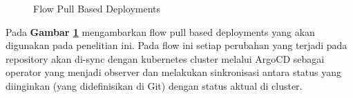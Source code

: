 \begin{figure}[H]
  \centering
  \caption{Flow Pull Based Deployments}
  \label{fig:flow_pull_based_deployments}
\end{figure}

Pada \textbf{Gambar \ref{fig:flow_pull_based_deployments}} mengambarkan flow
pull based deployments yang akan digunakan pada penelitian ini. Pada flow ini
setiap perubahan yang terjadi pada repository akan di-sync dengan kubernetes
cluster melalui ArgoCD sebagai operator yang menjadi observer dan melakukan
sinkronisasi antara status yang diinginkan (yang didefinisikan di Git) dengan
status aktual di cluster.


